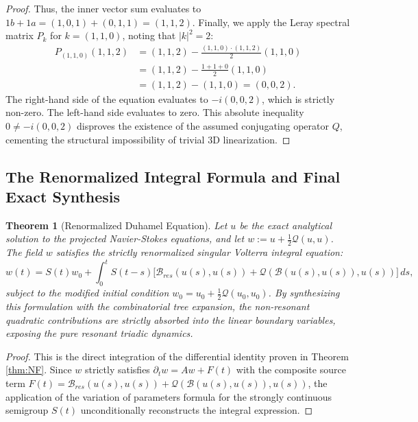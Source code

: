 \documentclass[12pt,a4paper]{article}
\theoremstyle{plain}
\newtheorem{theorem}{Theorem}[section]
\theoremstyle{definition}
\theoremstyle{remark}
\newcommand{\BB}{\mathcal{B}}
\newcommand{\Bres}{\mathcal{B}_{res}}
\newcommand{\QQ}{\mathcal{Q}}
\begin{document}
\begin{proof}
Thus, the inner vector sum evaluates to $1b + 1a = (1,0,1) + (0,1,1) = (1,1,2)$. 
Finally, we apply the Leray spectral matrix $P_k$ for $k = (1,1,0)$, noting that $|k|^2 = 2$:
\begin{align*}
  P_{(1,1,0)}(1,1,2) 
  &= (1,1,2) - \frac{(1,1,0) \cdot (1,1,2)}{2}(1,1,0) \\
  &= (1,1,2) - \frac{1+1+0}{2}(1,1,0) \\
  &= (1,1,2) - (1,1,0) = (0,0,2).
\end{align*}
The right-hand side of the equation evaluates to $-i(0,0,2)$, which is strictly non-zero. The left-hand side evaluates to zero. This absolute inequality $0 \neq -i(0,0,2)$ disproves the existence of the assumed conjugating operator $Q$, cementing the structural impossibility of trivial 3D linearization.
\end{proof}


\subsection{The Renormalized Integral Formula and Final Exact Synthesis}
\label{subsec:final_synthesis}

\begin{theorem}[Renormalized Duhamel Equation]
\label{thm:renorm}
Let $u$ be the exact analytical solution to the projected Navier-Stokes equations, and let $w := u + \frac{1}{2}\QQ(u,u)$. The field $w$ satisfies the strictly renormalized singular Volterra integral equation:
\[
  w(t) = S(t)w_0 + \int_0^t S(t-s)\Big[\Bres(u(s),u(s)) + \QQ(\BB(u(s),u(s)),u(s))\Big]\,ds,
\]
subject to the modified initial condition $w_0 = u_0 + \frac{1}{2}\QQ(u_0,u_0)$. By synthesizing this formulation with the combinatorial tree expansion, the non-resonant quadratic contributions are strictly absorbed into the linear boundary variables, exposing the pure resonant triadic dynamics.
\end{theorem}

\begin{proof}
This is the direct integration of the differential identity proven in Theorem \ref{thm:NF}. Since $w$ strictly satisfies $\partial_t w = Aw + F(t)$ with the composite source term $F(t) = \Bres(u(s),u(s)) + \QQ(\BB(u(s),u(s)),u(s))$, the application of the variation of parameters formula for the strongly continuous semigroup $S(t)$ unconditionally reconstructs the integral expression.
\end{proof}
\end{document}
